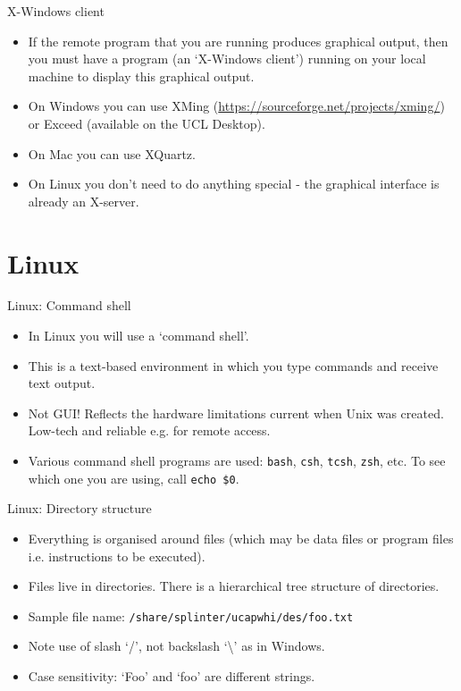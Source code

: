 \documentclass{beamer}
\begin{document}
\begin{frame}{X-Windows client}
  \begin{itemize}
    \item If the remote program that you are running produces graphical output, then you must have a program (an `X-Windows client') running on your local machine to display this graphical output.
    \item On Windows you can use XMing (\url{https://sourceforge.net/projects/xming/}) or Exceed (available on the UCL Desktop).
    \item On Mac you can use XQuartz.
    \item On Linux you don't need to do anything special - the graphical interface is already an X-server.
  \end{itemize}
\end{frame}


\section{Linux}

\begin{frame}{Linux: Command shell}
  \begin{itemize}
    \item{In Linux you will use a `command shell'.}
    \item{This is a text-based environment in which you type commands and receive text output.}
    \item{Not GUI! Reflects the hardware limitations current when Unix was created. Low-tech and reliable e.g. for remote access.}
    \item{Various command shell programs are used: \texttt{bash}, \texttt{csh}, \texttt{tcsh}, \texttt{zsh}, etc. To see which one you are using, call \texttt{echo \$0}.}
   \end{itemize}
\end{frame}

\begin{frame}{Linux: Directory structure}
  \begin{itemize}
    \item{Everything is organised around files (which may be data files or program files i.e. instructions to be executed).}
    \item{Files live in directories. There is a hierarchical tree structure of directories.}
    \item{Sample file name: \texttt{/share/splinter/ucapwhi/des/foo.txt}}
    \item{Note use of slash `/', not backslash `\textbackslash' as in Windows.}
    \item{Case sensitivity: `Foo' and `foo' are different strings.}
  \end{itemize}
\end{frame}
\end{document}
